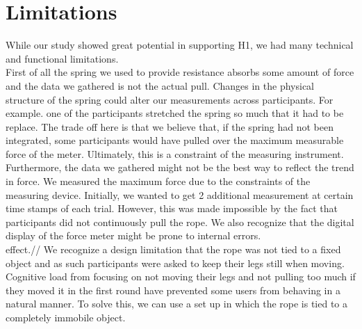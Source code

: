\section{Limitations}
\label{section:limitations}
While our study showed great potential in supporting H1, we had many technical and functional limitations.\\
First of all the spring we used to provide resistance absorbs some amount of force and the data we gathered is not the actual pull. Changes in the physical structure of the spring could alter our measurements across participants. For example. one of the participants stretched the spring so much that it had to be replace. The trade off here is that we believe that, if the spring had not been integrated, some participants would have pulled over the maximum measurable force of the meter. Ultimately, this is a constraint of the measuring instrument. \\
Furthermore, the data we gathered might not be the best way to reflect the trend in force. We measured the maximum force due to the constraints of the measuring device. Initially, we wanted to get 2 additional measurement at certain time stamps of each trial. However, this was made impossible by the fact that participants did not continuously pull the rope. We also recognize that the digital display of the force meter might be prone to internal errors. \\
effect.//
We recognize a design limitation that the rope was not tied to a fixed object and as such participants were asked to keep their legs still when moving. Cognitive load from focusing on not moving their legs and not pulling too much if they moved it in the first round have prevented some users from behaving in a natural manner. To solve this, we can use a set up in which the rope is tied to a completely immobile object.\\
